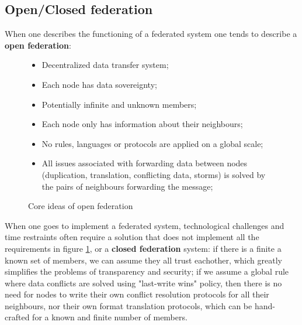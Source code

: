 \documentclass[journal]{IEEEtran}
\begin{document}
\subsection{Open/Closed federation}

When one describes the functioning of a federated system one tends to describe a \textbf{open federation}:

\begin{figure}[h]

	\begin{itemize}

		\item Decentralized data transfer system;

		\item Each node has data sovereignty;

		\item Potentially infinite and unknown members;

		\item Each node only has information about their neighbours;

		\item No rules, languages or protocols are applied on a global scale;

		\item All issues associated with forwarding data between nodes (duplication, translation, conflicting data, storms) is solved by the pairs of neighbours forwarding the message;

	\end{itemize}
	\caption{Core ideas of open federation}
	\label{list:FEDOPEN}

\end{figure}


When one goes to implement a federated system, technological challenges and time restraints often require a solution that does not implement all the requirements in figure \ref{list:FEDOPEN}, or a \textbf{closed federation} system: if there is a finite a known set of members, we can assume they all trust eachother, which greatly simplifies the problems of transparency and security; if we assume a global rule where data conflicts are solved using "last-write wins" policy, then there is no need for nodes to write their own conflict resolution protocols for all their neighbours, nor their own format translation protocols, which can be hand-crafted  for a known and finite number of members.
\end{document}
